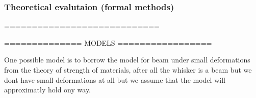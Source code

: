 \subsubsection{ Theoretical evalutaion (formal methods)}

============================

============== MODELS =================

One possible model is to borrow the model for beam under small 
deformations from the theory of strength of materials,
after all the whisker is a beam but we dont have small 
deformations at all but we assume that the model will approximatly hold ony way.


